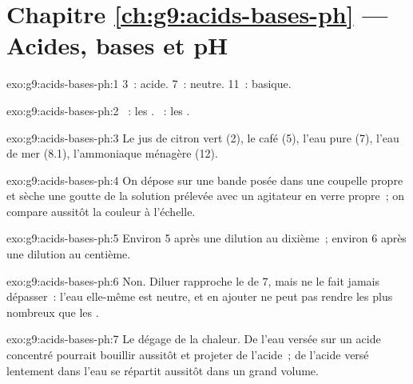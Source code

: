\section*{Chapitre \ref{ch:g9:acids-bases-ph} --- Acides, bases et pH}

\begin{solution}{exo:g9:acids-bases-ph:1}
 3~: acide.  7~: neutre.  11~: basique.
\end{solution}

\begin{solution}{exo:g9:acids-bases-ph:2}
~: les  . ~: les  .
\end{solution}

\begin{solution}{exo:g9:acids-bases-ph:3}
Le jus de citron vert (2), le café (5), l'eau pure (7), l'eau de mer
(8.1), l'ammoniaque ménagère (12).
\end{solution}

\begin{solution}{exo:g9:acids-bases-ph:4}
On dépose sur une bande posée dans une coupelle propre et sèche une
goutte de la solution prélevée avec un agitateur en verre propre~; on
compare aussitôt la couleur à l'échelle.
\end{solution}

\begin{solution}{exo:g9:acids-bases-ph:5}
Environ 5 après une dilution au dixième~; environ 6 après une dilution
au centième.
\end{solution}

\begin{solution}{exo:g9:acids-bases-ph:6}
Non. Diluer rapproche le  de 7, mais ne le fait jamais dépasser~:
l'eau elle-même est neutre, et en ajouter ne peut pas rendre les 
 plus nombreux que les  .
\end{solution}

\begin{solution}{exo:g9:acids-bases-ph:7}
Le  dégage de la chaleur. De l'eau versée sur un acide concentré
pourrait bouillir aussitôt et projeter de l'acide~; de l'acide versé
lentement dans l'eau se répartit aussitôt dans un grand volume.
\end{solution}

